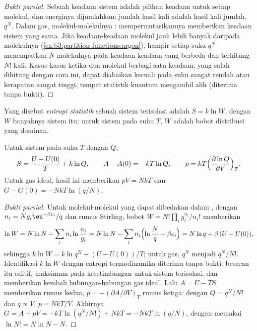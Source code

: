 \begin{proof}[Bukti parsial]
Sebuah keadaan sistem adalah pilihan keadaan untuk setiap molekul, dan
energinya dijumlahkan: jumlah hasil kali adalah hasil kali jumlah, $q^N$.
Dalam gas, molekul-molekulnya : mempermutasikannya memberikan
keadaan sistem yang sama. Jika keadaan-keadaan molekul jauh lebih banyak
daripada molekulnya (\cref{ex:b3:partition-functions:argon}), hampir setiap
suku $q^N$ menempatkan $N$ molekulnya pada keadaan-keadaan yang berbeda dan
terhitung $N!$ kali. Kasus-kasus ketika dua molekul berbagi satu keadaan,
yang salah dihitung dengan cara ini, dapat diabaikan kecuali pada suhu
sangat rendah atau kerapatan sangat tinggi, tempat statistik kuantum
mengambil alih (diterima tanpa bukti).
\end{proof}

\begin{definition}\label{def:b3:partition-functions:statistical-entropy}
Yang disebut \emph{entropi statistik} sebuah sistem
terisolasi adalah $S = k\ln W$, dengan $W$ banyaknya  sistem itu;
untuk sistem pada suhu $T$, $W$ adalah bobot distribusi yang dominan.
\end{definition}

\begin{theorem}\label{thm:b3:partition-functions:entropy}
Untuk sistem pada suhu $T$ dengan  $Q$,
\[
  S = \frac{U - U(0)}{T} + k\ln Q, \qquad A - A(0) = -kT\ln Q, \qquad
  p = kT\Bigl(\frac{\partial\ln Q}{\partial V}\Bigr)_T .
\]
Untuk gas ideal, hasil ini memberikan $pV = NkT$ dan $G - G(0) = -NkT\ln(q/N)$.
\end{theorem}

\begin{proof}[Bukti parsial]
Untuk molekul-molekul yang dapat dibedakan dalam , dengan
$n_i = Ng_i\eu^{-\beta\varepsilon_i}/q$ dan rumus Stirling, bobot
$W = N!\prod_ig_i^{n_i}/n_i!$ memberikan
\[
  \ln W = N\ln N - \sum_in_i\ln\frac{n_i}{g_i} = N\ln N - \sum_in_i\Bigl(\ln\frac Nq - \beta\varepsilon_i\Bigr)
        = N\ln q + \beta\,(U - U(0)),
\]
sehingga $k\ln W = k\ln q^N + (U - U(0))/T$; untuk gas, $q^N$ menjadi $q^N/N!$.
Identifikasi $k\ln W$ dengan entropi termodinamika diterima tanpa bukti:
besaran itu aditif, maksimum pada kesetimbangan untuk sistem terisolasi, dan
memberikan kembali hubungan-hubungan gas ideal. Lalu $A = U - TS$ memberikan
rumus kedua, $p =
-(\partial A/\partial V)_T$ rumus ketiga: dengan $Q = q^N/N!$ dan $q \propto V$,
$p = NkT/V$. Akhirnya $G = A + pV = -kT\ln(q^N/N!) + NkT = -NkT\ln(q/N)$, dengan
memakai $\ln N! = N\ln N - N$.
\end{proof}

